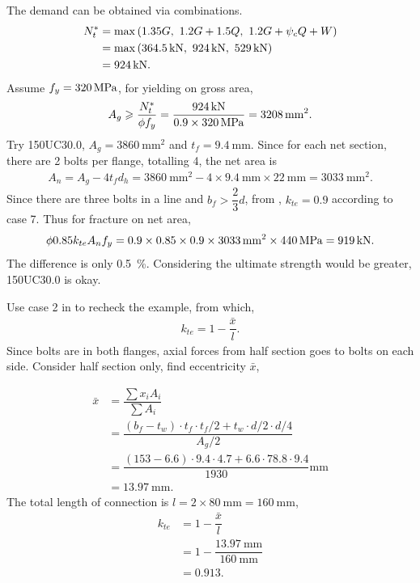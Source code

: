 \begin{solution}
The demand can be obtained via combinations.
\begin{align*}
N^*_t&=\max\left(1.35G,~1.2G+1.5Q,~1.2G+\psi_cQ+W\right)\\
&=\max\left(\SI{364.5}{\kilo\newton},~\SI{924}{\kilo\newton},~\SI{529}{\kilo\newton}\right)\\
&=\SI{924}{\kilo\newton}.
\end{align*}
Assume $f_y=\SI{320}{\mega\pascal}$, for yielding on gross area,
\begin{gather*}
A_g\geqslant\dfrac{N^*_t}{\phi{}f_y}=\dfrac{\SI{924}{\kilo\newton}}{0.9\times\SI{320}{\mega\pascal}}=\SI{3208}{\milli\meter^2}.
\end{gather*}
Try 150UC30.0, $A_g=\SI{3860}{\mm^2}$ and $t_f=\SI{9.4}{\mm}$. Since for each net section, there are 2 bolts per flange, totalling 4, the net area is
\begin{gather*}
A_n=A_g-4t_fd_h=\SI{3860}{\mm^2}-4\times\SI{9.4}{\mm}\times\SI{22}{\mm}=\SI{3033}{\mm^2}.
\end{gather*}
Since there are three bolts in a line and $b_f>\dfrac{2}{3}d$, from , $k_{te}=0.9$ according to case 7. Thus for fracture on net area,
\begin{gather*}
\phi0.85k_{te}A_nf_y=0.9\times0.85\times0.9\times\SI{3033}{\milli\meter^2}\times\SI{440}{\mega\pascal}=\SI{919}{\kilo\newton}.
\end{gather*}
The difference is only \SI{0.5}{\percent}. Considering the ultimate strength would be greater, 150UC30.0 is okay.

Use case 2 in  to recheck the example, from which,
\begin{gather*}
k_{te}=1-\dfrac{\bar{x}}{l}.
\end{gather*}
Since bolts are in both flanges, axial forces from half section goes to bolts on each side. Consider half section only, find eccentricity $\bar{x}$,

\begin{minipage}{6cm}
\centering
\end{minipage}
\begin{minipage}{.99\linewidth-6cm}
\begin{align*}
\bar{x}&=\dfrac{\sum{}x_iA_i}{\sum{}A_i}\\&=\dfrac{\left(b_f-t_w\right)\cdot{}t_f\cdot{}t_f/2+t_w\cdot{}d/2\cdot{}d/4}{A_g/2}\\
&=\dfrac{\left(153-6.6\right)\cdot{}9.4\cdot{}4.7+6.6\cdot{}78.8\cdot{}9.4}{1930}\si{\mm}\\
&=\SI{13.97}{\mm}.
\end{align*}
The total length of connection is $l=2\times\SI{80}{\mm}=\SI{160}{\mm}$,
\begin{align*}
k_{te}&=1-\dfrac{\bar{x}}{l}\\
&=1-\dfrac{\SI{13.97}{\mm}}{\SI{160}{\mm}}\\
&=0.913.
\end{align*}
\end{minipage}


\end{solution}
